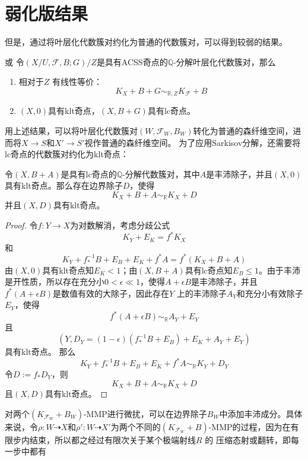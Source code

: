 \section{弱化版结果}
但是，通过将叶层化代数簇对约化为普通的代数簇对，可以得到较弱的结果。
\begin{theorem}\cite[Proposition 3.6]{acss}或\cite[Proposition 7.3.6]{chlx}  
  令$(X/U,\mathcal{F},B;G)/Z$是具有ACSS奇点的$\mathbb{Q}$-分解叶层化代数簇对，那么
  \begin{enumerate}
    \item 相对于$Z$ 有线性等价：
      \[ K_{X}+B+G\sim_{\mathbb{R},Z}K_{\mathcal{F}}+B \]
    \item $(X,0)$具有klt奇点，$(X,B+G)$具有lc奇点。
  \end{enumerate}
\end{theorem}
用上述结果，可以将叶层化代数簇对$(W,\mathcal{F}_{W},B_{W})$转化为普通的森纤维空间，进而将$X\to S$和$X' \to S'$视作普通的森纤维空间。
为了应用Sarkisov分解，还需要将lc奇点的代数簇对约化为klt奇点：
\begin{lemma}\label{lctoklt}
 令$(X,B+A)$是具有lc奇点的$\mathbb{Q}$-分解代数簇对，其中$A$是丰沛除子，并且$(X,0)$具有klt奇点。那么存在边界除子$D$，使得
 \[ K_{X}+B+A\sim_{\mathbb{R}}K_{X}+D \]
 并且$(X,D)$具有klt奇点。
\end{lemma}
\begin{proof}
  令$f:Y\to X$为对数解消，考虑分歧公式
  \[ K_{Y}+E_{K}=f^{*}K_{X} \]
  和
  \[ K_{Y}+f^{-1}_{*}B+E_{B}+E_{K}+f^{*}A=f^{*}(K_{X}+B+A) \]
  由$(X,0)$具有klt奇点知$E_{K}< 1 $；由$(X,B+A)$具有lc奇点知$E_{B}\leqslant 1$。由于丰沛是开性质，所以存在充分小$0< \epsilon \ll 1$，使得$A+\epsilon B$是丰沛除子，并且$f^{*}(A+\epsilon B)$是数值有效的大除子，因此存在$Y$ 上的丰沛除子$A_{Y}$和充分小有效除子$E_{Y}$，使得
  \[ f^{*}(A+\epsilon B)\sim_{\mathbb{R}} A_{Y}+E_{Y} \]
  且
  \[ \left(Y,D_{Y}=(1-\epsilon)(f^{-1}_{*}B+E_{B})+E_{K}+A_{Y}+E_{Y}\right) \]
  具有klt奇点。 那么
  \[ K_{Y}+f^{-1}_{*}B+E_{B}+E_{K}+f^{*}A\sim_{\mathbb{R}} K_{Y}+D_{Y} \]
  令$D:=f_{*}D_{Y}$，则
  \[ K_{X}+B+A\sim_{\mathbb{R}} K_{X}+D \]
  且$(X,D)$具有klt奇点。
\end{proof}
对两个$(K_{\mathcal{F}_{W}}+B_{W})$-MMP进行微扰，可以在边界除子$B_{W}$中添加丰沛成分。具体来说，令$\rho:W \dashrightarrow X$和$\rho': W \dashrightarrow X'$为两个不同的$(K_{\mathcal{F}_{W}}+B)$-MMP的过程，因为在有限步内结束，所以都之经过有限次关于某个极端射线$R$ 的 压缩态射或翻转，即每一步中都有

